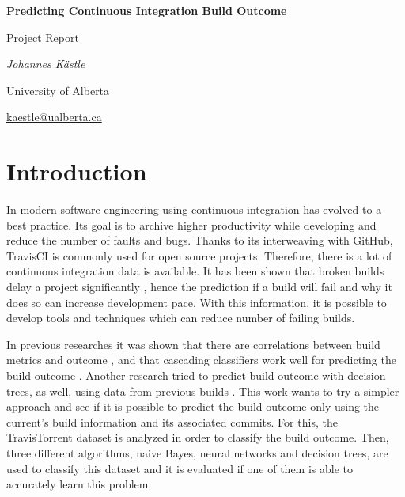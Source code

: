\documentclass[a4paper,11pt]{article}
\begin{document}
	
	\begin{center}
	{\huge\bfseries Predicting Continuous Integration Build Outcome \par}
	{\Large Project Report\par}
	
	\vspace{1cm}
	{\Large\itshape Johannes Kästle\par}
	{ University of Alberta \par}
	\href{mailto:kaestle@ualberta.ca}{kaestle@ualberta.ca}
	\end{center}


\setlength{\parindent}{0pt}
\setlength{\parskip}{1.5ex plus0.5ex minus0.5ex}

\begin{abstract}
	In order to improve developers productivity and increase development pace, it is tried to predict the outcome of continuous integration builds. For that, $2,500,756$ builds with $37$ features were analyzed, using three different machine learning algorithms with over $700$ configurations. Generally, all classifiers struggled with predicting failures, but had high sensitivity. At the end, the decision tree classifier could predict the outcome with an accuracy of $76\%$ and performed significantly better than its competitors. 
\end{abstract}

\section{Introduction}

In modern software engineering using continuous integration has evolved to a best practice. Its goal is to archive higher productivity while developing and reduce the number of faults and bugs. Thanks to its interweaving with GitHub, TravisCI is commonly used for open source projects. Therefore, there is a lot of continuous integration data is available. It has been shown that broken builds delay a project significantly \cite{CIDelay}, hence the prediction if a build will fail and why it does so can increase development pace. With this information, it is possible to develop tools and techniques which can reduce number of failing builds. 

In previous researches it was shown that there are correlations between build metrics and outcome \cite{correlation}, and that cascading classifiers work well for predicting the build outcome \cite{cascade}. Another research tried to predict build outcome with decision trees, as well, using data from previous builds \cite{treeTimes}. This work wants to try a simpler approach and see if it is possible to predict the build outcome only using the current's build information and its associated commits. For this, the TravisTorrent \cite{msr17challenge} dataset is analyzed in order to classify the build outcome. Then, three different algorithms, naive Bayes, neural networks and decision trees, are used to classify this dataset and it is evaluated if one of them is able to accurately learn this problem. 
\end{document}
